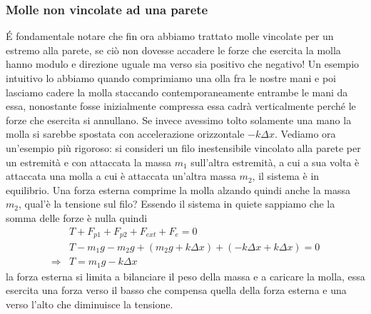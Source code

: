 \subsubsection*{Molle non vincolate ad una parete}
\'{E} fondamentale notare che fin ora abbiamo trattato molle vincolate per un estremo alla parete, se ciò non dovesse accadere le forze che esercita la molla hanno modulo e direzione uguale ma verso sia positivo che negativo! Un esempio intuitivo lo abbiamo quando comprimiamo una olla fra le nostre mani e poi lasciamo cadere la molla staccando contemporaneamente entrambe le mani da essa, nonostante fosse inizialmente compressa essa cadrà verticalmente perché le forze che esercita si annullano. Se invece avessimo tolto solamente una mano la molla si sarebbe spostata con accelerazione orizzontale $-k \Delta x$. Vediamo ora un'esempio più rigoroso: si consideri un filo inestensibile vincolato alla parete per un estremità e con attaccata la massa $m_1$ sull'altra estremità, a cui a sua volta è attaccata una molla a cui è attaccata un'altra massa $m_2$, il sistema è in equilibrio. Una forza esterna comprime la molla alzando quindi anche la massa $m_2$, qual'è la tensione sul filo? Essendo il sistema in quiete sappiamo che la somma delle forze è nulla quindi
\begin{align*}
	&T + F_{p1}+F_{p2}+F_{ext}+F_e = 0\\
	&T -m_1g-m_2g+(m_2g + k\Delta x) + (-k\Delta x + k\Delta x)= 0\\
	\Rightarrow & T = m_1 g - k \Delta x 
\end{align*}
la forza esterna si limita a bilanciare il peso della massa e a caricare la molla, essa esercita una forza verso il basso che compensa quella della forza esterna e una verso l'alto che diminuisce la tensione. 
